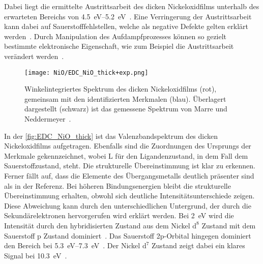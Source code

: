         Dabei liegt die ermittelte Austrittsarbeit des dicken Nickeloxidfilms unterhalb des erwarteten Bereichs von \SIrange{4.5}{5.2}{\electronvolt}~\cite{poulain_electronic_2020}.
        Eine Verringerung der Austrittsarbeit kann dabei auf Sauerstofffehlstellen, welche als negative Defekte gelten erklärt werden~\cite{IF_3}.
        Durch Manipulation des Aufdampfprozesses können so gezielt bestimmte elektronische Eigenschaft, wie zum Beispiel die Austrittsarbeit verändert werden~\cite{poulain_electronic_2020}.

        \begin{figure}
            \centering
            \texttt{[image: NiO/EDC\_NiO\_thick+exp.png]}
            \caption{Winkelintegriertes Spektrum des dicken Nickeloxidfilms (rot), gemeinsam mit den identifizierten Merkmalen (blau).
            Überlagert dargestellt (schwarz) ist das gemessene Spektrum von Marre und Neddermeyer~\cite{NiO_7}.} 
            \label{fig:EDC_NiO_thick}
        \end{figure}
        In der \autoref{fig:EDC_NiO_thick} ist das Valenzbandspektrum des dicken Nickeloxidfilms aufgetragen.
        Ebenfalls sind die Zuordnungen des Ursprungs der Merkmale gekennzeichnet, wobei L für den Ligandenzustand, in dem Fall dem Sauerstoffzustand, steht.
        Die strukturelle Übereinstimmung ist klar zu erkennen. 
        Ferner fällt auf, dass die Elemente des Übergangsmetalls deutlich präsenter sind als in der Referenz.
        Bei höheren Bindungsenergien bleibt die strukturelle Übereinstimmung erhalten, obwohl sich deutliche Intensitätsunterschiede zeigen.
        Diese Abweichung kann durch den unterschiedlichen Untergrund, der durch die Sekundärelektronen hervorgerufen wird erklärt werden.
        Bei \SI{2}{\electronvolt} wird die Intensität durch den hybridisierten Zustand aus dem Nickel $\text{d}^8$ Zustand mit dem Sauerstoff p Zustand dominiert~\cite{NiO_13}.
        Das Sauerstoff 2p-Orbital hingegen dominiert den Bereich bei \SIrange[range-phrase=\:und\:]{5.3}{7.3}{\electronvolt}~\cite{NiO_13}.
        Der Nickel $\text{d}^7$ Zustand zeigt dabei ein klares Signal bei \SI{10.3}{\electronvolt}~\cite{NiO_13}.

